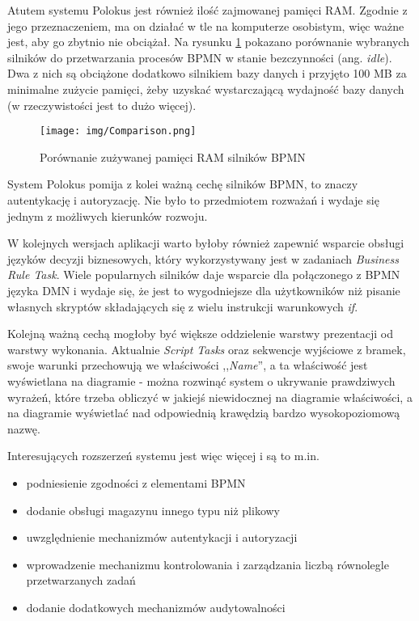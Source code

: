 \documentclass[declaration,shortabstract,mgr]{iithesis}
\newcommand{\bpmn}{BPMN }
\newcommand{\bpmnnospace}{BPMN}
\begin{document}
Atutem systemu Polokus jest również ilość zajmowanej pamięci RAM. Zgodnie z jego przeznaczeniem, ma on działać w tle na komputerze osobistym, więc ważne jest, aby go zbytnio nie obciążał. Na rysunku \ref{fig:comparison} pokazano porównanie wybranych silników do przetwarzania procesów \bpmn w stanie bezczynności (ang. \textit{idle}). Dwa z nich są obciążone dodatkowo silnikiem bazy danych i przyjęto 100 MB za minimalne zużycie pamięci, żeby uzyskać wystarczającą wydajność bazy danych (w rzeczywistości jest to dużo więcej).

\begin{figure}[H]
    \texttt{[image: img/Comparison.png]}
    \caption{Porównanie zużywanej pamięci RAM silników BPMN}
    \label{fig:comparison}
\end{figure}

System Polokus pomija z kolei ważną cechę silników \bpmnnospace, to znaczy autentykację i autoryzację. Nie było to przedmiotem rozważań i wydaje się jednym z możliwych kierunków rozwoju.

W kolejnych wersjach aplikacji warto byłoby również zapewnić wsparcie obsługi języków decyzji biznesowych, który wykorzystywany jest w zadaniach \textit{Business Rule Task}. Wiele popularnych silników daje wsparcie dla połączonego z \bpmn języka DMN i wydaje się, że jest to wygodniejsze dla użytkowników niż pisanie własnych skryptów składających się z wielu instrukcji warunkowych \textit{if}. 

Kolejną ważną cechą mogłoby być większe oddzielenie warstwy prezentacji od warstwy wykonania. Aktualnie \textit{Script Tasks} oraz sekwencje wyjściowe z bramek, swoje warunki przechowują we właściwości ,,\textit{Name}'', a ta właściwość jest wyświetlana na diagramie - można rozwinąć system o ukrywanie prawdziwych wyrażeń, które trzeba obliczyć w jakiejś niewidocznej na diagramie właściwości, a na diagramie wyświetlać nad odpowiednią krawędzią bardzo wysokopoziomową nazwę.

Interesujących rozszerzeń systemu jest więc więcej i są to m.in.

\begin{itemize}
\item podniesienie zgodności z elementami \bpmn
\item dodanie obsługi magazynu innego typu niż plikowy
\item uwzględnienie mechanizmów autentykacji i autoryzacji
\item wprowadzenie mechanizmu kontrolowania i zarządzania liczbą
równolegle przetwarzanych zadań
\item dodanie dodatkowych mechanizmów audytowalności
\end{itemize}
\end{document}
